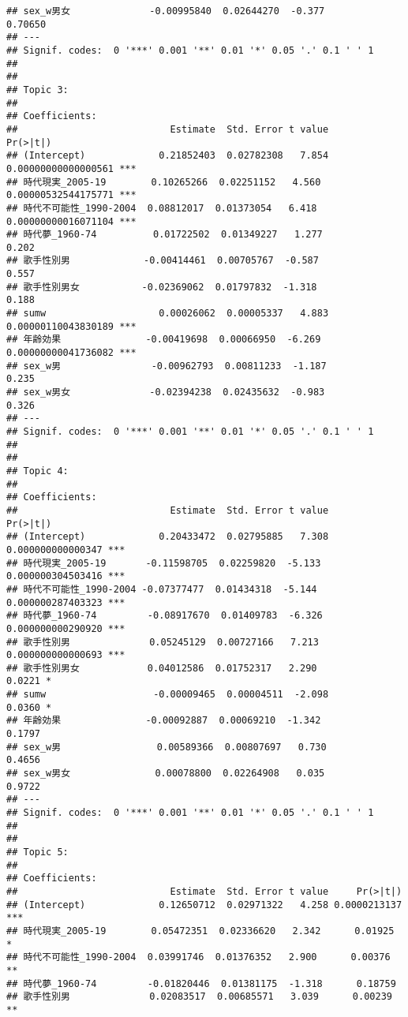\documentclass[
]{article}
\begin{document}
\begin{verbatim}
## sex_w男女              -0.00995840  0.02644270  -0.377              0.70650    
## ---
## Signif. codes:  0 '***' 0.001 '**' 0.01 '*' 0.05 '.' 0.1 ' ' 1
## 
## 
## Topic 3:
## 
## Coefficients:
##                           Estimate  Std. Error t value            Pr(>|t|)    
## (Intercept)             0.21852403  0.02782308   7.854 0.00000000000000561 ***
## 時代現実_2005-19        0.10265266  0.02251152   4.560 0.00000532544175771 ***
## 時代不可能性_1990-2004  0.08812017  0.01373054   6.418 0.00000000016071104 ***
## 時代夢_1960-74          0.01722502  0.01349227   1.277               0.202    
## 歌手性別男             -0.00414461  0.00705767  -0.587               0.557    
## 歌手性別男女           -0.02369062  0.01797832  -1.318               0.188    
## sumw                    0.00026062  0.00005337   4.883 0.00000110043830189 ***
## 年齢効果               -0.00419698  0.00066950  -6.269 0.00000000041736082 ***
## sex_w男                -0.00962793  0.00811233  -1.187               0.235    
## sex_w男女              -0.02394238  0.02435632  -0.983               0.326    
## ---
## Signif. codes:  0 '***' 0.001 '**' 0.01 '*' 0.05 '.' 0.1 ' ' 1
## 
## 
## Topic 4:
## 
## Coefficients:
##                           Estimate  Std. Error t value          Pr(>|t|)    
## (Intercept)             0.20433472  0.02795885   7.308 0.000000000000347 ***
## 時代現実_2005-19       -0.11598705  0.02259820  -5.133 0.000000304503416 ***
## 時代不可能性_1990-2004 -0.07377477  0.01434318  -5.144 0.000000287403323 ***
## 時代夢_1960-74         -0.08917670  0.01409783  -6.326 0.000000000290920 ***
## 歌手性別男              0.05245129  0.00727166   7.213 0.000000000000693 ***
## 歌手性別男女            0.04012586  0.01752317   2.290            0.0221 *  
## sumw                   -0.00009465  0.00004511  -2.098            0.0360 *  
## 年齢効果               -0.00092887  0.00069210  -1.342            0.1797    
## sex_w男                 0.00589366  0.00807697   0.730            0.4656    
## sex_w男女               0.00078800  0.02264908   0.035            0.9722    
## ---
## Signif. codes:  0 '***' 0.001 '**' 0.01 '*' 0.05 '.' 0.1 ' ' 1
## 
## 
## Topic 5:
## 
## Coefficients:
##                           Estimate  Std. Error t value     Pr(>|t|)    
## (Intercept)             0.12650712  0.02971322   4.258 0.0000213137 ***
## 時代現実_2005-19        0.05472351  0.02336620   2.342      0.01925 *  
## 時代不可能性_1990-2004  0.03991746  0.01376352   2.900      0.00376 ** 
## 時代夢_1960-74         -0.01820446  0.01381175  -1.318      0.18759    
## 歌手性別男              0.02083517  0.00685571   3.039      0.00239 ** 

\end{verbatim}
\end{document}
